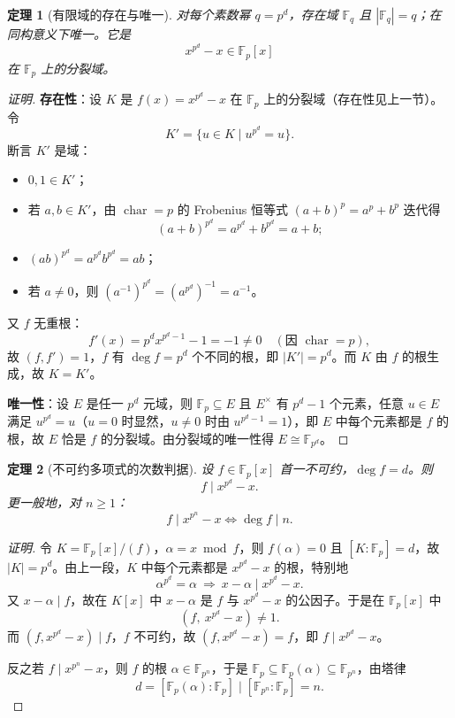 \documentclass[11pt,a4paper]{ctexart}
\newtheorem*{theorem}{定理}
\theoremstyle{remark}
\DeclareMathOperator{\chr}{char}
\newcommand{\Fp}{\mathbb{F}_p}
\begin{document}
\begin{theorem}[有限域的存在与唯一]
对每个素数幂 $q=p^{d}$，存在域 $\mathbb{F}_{q}$ 且 $|\mathbb{F}_{q}|=q$；在同构意义下唯一。它是
\[
x^{p^{d}}-x\in\Fp[x]
\]
在 $\Fp$ 上的分裂域。
\end{theorem}

\begin{proof}[证明]
\textbf{存在性}：设 $K$ 是 $f(x)=x^{p^{d}}-x$ 在 $\Fp$ 上的分裂域（存在性见上一节）。令
\[
K'=\{u\in K\mid u^{p^{d}}=u\}.
\]
断言 $K'$ 是域：
\begin{itemize}
    \item $0,1\in K'$；
    \item 若 $a,b\in K'$，由 $\chr=p$ 的 Frobenius 恒等式 $(a+b)^{p}=a^{p}+b^{p}$ 迭代得
    \[
    (a+b)^{p^{d}}=a^{p^{d}}+b^{p^{d}}=a+b ;
    \]
    \item $(ab)^{p^{d}}=a^{p^{d}}b^{p^{d}}=ab$；
    \item 若 $a\neq0$，则 $(a^{-1})^{p^{d}}=(a^{p^{d}})^{-1}=a^{-1}$。
\end{itemize}
又 $f$ 无重根：
\[
f'(x)=p^{d}x^{p^{d}-1}-1=-1\neq 0\quad(\text{因 }\chr=p),
\]
故 $(f,f')=1$，$f$ 有 $\deg f=p^{d}$ 个不同的根，即 $|K'|=p^{d}$。而 $K$ 由 $f$ 的根生成，故 $K=K'$。

\textbf{唯一性}：设 $E$ 是任一 $p^{d}$ 元域，则 $\Fp\subseteq E$ 且 $E^{\times}$ 有 $p^{d}-1$ 个元素，任意 $u\in E$ 满足 $u^{p^{d}}=u$（$u=0$ 时显然，$u\neq0$ 时由 $u^{p^{d}-1}=1$），即 $E$ 中每个元素都是 $f$ 的根，故 $E$ 恰是 $f$ 的分裂域。由分裂域的唯一性得 $E\cong\mathbb{F}_{p^{d}}$。
\end{proof}

\begin{theorem}[不可约多项式的次数判据]
设 $f\in\Fp[x]$ 首一不可约，$\deg f=d$。则
\[
f\mid x^{p^{d}}-x .
\]
更一般地，对 $n\ge1$：
\[
f\mid x^{p^{n}}-x\iff \deg f\mid n .
\]
\end{theorem}

\begin{proof}[证明]
令 $K=\Fp[x]/(f)$，$\alpha=x\bmod f$，则 $f(\alpha)=0$ 且 $[K:\Fp]=d$，故 $|K|=p^{d}$。由上一段，$K$ 中每个元素都是 $x^{p^{d}}-x$ 的根，特别地
\[
\alpha^{p^{d}}=\alpha\ \Longrightarrow\ x-\alpha\mid x^{p^{d}}-x .
\]
又 $x-\alpha\mid f$，故在 $K[x]$ 中 $x-\alpha$ 是 $f$ 与 $x^{p^{d}}-x$ 的公因子。于是在 $\Fp[x]$ 中
\[
(f,\ x^{p^{d}}-x)\neq1 .
\]
而 $(f,x^{p^{d}}-x)\mid f$，$f$ 不可约，故 $(f,x^{p^{d}}-x)=f$，即 $f\mid x^{p^{d}}-x$。

反之若 $f\mid x^{p^{n}}-x$，则 $f$ 的根 $\alpha\in\mathbb{F}_{p^{n}}$，于是 $\Fp\subseteq\Fp(\alpha)\subseteq\mathbb{F}_{p^{n}}$，由塔律
\[
d=[\Fp(\alpha):\Fp]\mid[\mathbb{F}_{p^{n}}:\Fp]=n .
\]
\end{proof}
\end{document}
